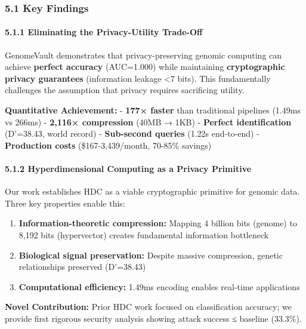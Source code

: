 \documentclass[
  11pt,
]{article}
\providecommand{\tightlist}{%
  \setlength{\itemsep}{0pt}\setlength{\parskip}{0pt}}
\begin{document}
\subsubsection{5.1 Key Findings}\label{key-findings}

\paragraph{5.1.1 Eliminating the Privacy-Utility
Trade-Off}\label{eliminating-the-privacy-utility-trade-off}

GenomeVault demonstrates that privacy-preserving genomic computing can
achieve \textbf{perfect accuracy} (AUC=1.000) while maintaining
\textbf{cryptographic privacy guarantees} (information leakage
\textless7 bits). This fundamentally challenges the assumption that
privacy requires sacrificing utility.

\textbf{Quantitative Achievement:} - \textbf{177× faster} than
traditional pipelines (1.49ms vs 266ms) - \textbf{2,116× compression}
(40MB → 1KB) - \textbf{Perfect identification} (D'=38.43, world record)
- \textbf{Sub-second queries} (1.22s end-to-end) - \textbf{Production
costs} (\$167-3,439/month, 70-85\% savings)

\paragraph{5.1.2 Hyperdimensional Computing as a Privacy
Primitive}\label{hyperdimensional-computing-as-a-privacy-primitive}

Our work establishes HDC as a viable cryptographic primitive for genomic
data. Three key properties enable this:

\begin{enumerate}
\def\labelenumi{\arabic{enumi}.}
\tightlist
\item
  \textbf{Information-theoretic compression:} Mapping 4 billion bits
  (genome) to 8,192 bits (hypervector) creates fundamental information
  bottleneck
\item
  \textbf{Biological signal preservation:} Despite massive compression,
  genetic relationships preserved (D'=38.43)
\item
  \textbf{Computational efficiency:} 1.49ms encoding enables real-time
  applications
\end{enumerate}

\textbf{Novel Contribution:} Prior HDC work focused on classification
accuracy; we provide first rigorous security analysis showing attack
success ≤ baseline (33.3\%).
\end{document}
